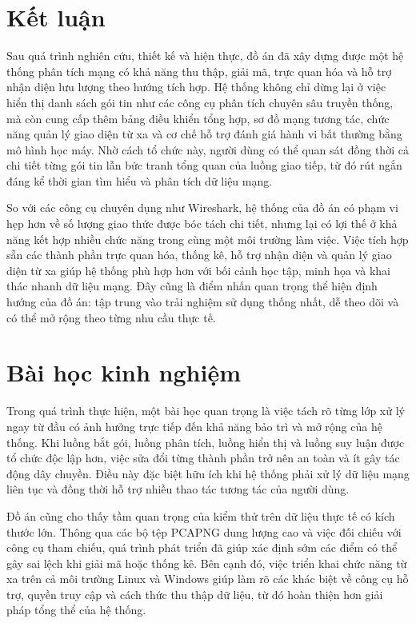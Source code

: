 \documentclass[../DoAn.tex]{subfiles}
\begin{document}
\section{Kết luận}
Sau quá trình nghiên cứu, thiết kế và hiện thực, đồ án đã xây dựng được một hệ thống phân tích mạng có khả năng thu thập, giải mã, trực quan hóa và hỗ trợ nhận diện lưu lượng theo hướng tích hợp. Hệ thống không chỉ dừng lại ở việc hiển thị danh sách gói tin như các công cụ phân tích chuyên sâu truyền thống, mà còn cung cấp thêm bảng điều khiển tổng hợp, sơ đồ mạng tương tác, chức năng quản lý giao diện từ xa và cơ chế hỗ trợ đánh giá hành vi bất thường bằng mô hình học máy. Nhờ cách tổ chức này, người dùng có thể quan sát đồng thời cả chi tiết từng gói tin lẫn bức tranh tổng quan của luồng giao tiếp, từ đó rút ngắn đáng kể thời gian tìm hiểu và phân tích dữ liệu mạng.

So với các công cụ chuyên dụng như Wireshark, hệ thống của đồ án có phạm vi hẹp hơn về số lượng giao thức được bóc tách chi tiết, nhưng lại có lợi thế ở khả năng kết hợp nhiều chức năng trong cùng một môi trường làm việc. Việc tích hợp sẵn các thành phần trực quan hóa, thống kê, hỗ trợ nhận diện và quản lý giao diện từ xa giúp hệ thống phù hợp hơn với bối cảnh học tập, minh họa và khai thác nhanh dữ liệu mạng. Đây cũng là điểm nhấn quan trọng thể hiện định hướng của đồ án: tập trung vào trải nghiệm sử dụng thống nhất, dễ theo dõi và có thể mở rộng theo từng nhu cầu thực tế.

\section{Bài học kinh nghiệm}
Trong quá trình thực hiện, một bài học quan trọng là việc tách rõ từng lớp xử lý ngay từ đầu có ảnh hưởng trực tiếp đến khả năng bảo trì và mở rộng của hệ thống. Khi luồng bắt gói, luồng phân tích, luồng hiển thị và luồng suy luận được tổ chức độc lập hơn, việc sửa đổi từng thành phần trở nên an toàn và ít gây tác động dây chuyền. Điều này đặc biệt hữu ích khi hệ thống phải xử lý dữ liệu mạng liên tục và đồng thời hỗ trợ nhiều thao tác tương tác của người dùng.

Đồ án cũng cho thấy tầm quan trọng của kiểm thử trên dữ liệu thực tế có kích thước lớn. Thông qua các bộ tệp PCAPNG dung lượng cao và việc đối chiếu với công cụ tham chiếu, quá trình phát triển đã giúp xác định sớm các điểm có thể gây sai lệch khi giải mã hoặc thống kê. Bên cạnh đó, việc triển khai chức năng từ xa trên cả môi trường Linux và Windows giúp làm rõ các khác biệt về công cụ hỗ trợ, quyền truy cập và cách thức thu thập dữ liệu, từ đó hoàn thiện hơn giải pháp tổng thể của hệ thống.
\end{document}
